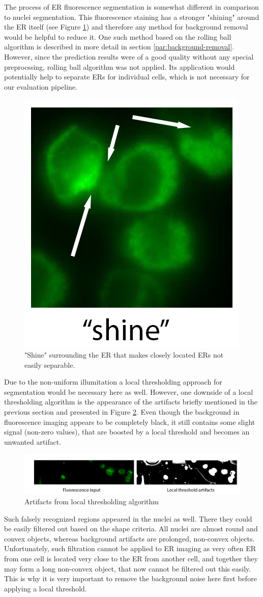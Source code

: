 The process of ER fluorescence segmentation is somewhat different in comparison to nuclei segmentation. This fluorescence staining has a stronger "shining" around the ER itself (see Figure \ref{fig:shine-er}) and therefore any method for background removal would be helpful to reduce it. One such method based on the rolling ball algorithm is described in more detail in section \ref{par:background-removal}. However, since the prediction results were of a good quality without any special preprocssing, rolling ball algorithm was not applied. Its application would potentially help to separate ERs for individual cells, which is not necessary for our evaluation pipeline.

\begin{figure}[htb]
	\begin{center}
		\includegraphics[width=0.2\linewidth]{bilder/ER/shine.png}
		\caption{"Shine" surrounding the ER that makes closely located ERs not easily separable.}\label{fig:shine-er}
	\end{center}
\end{figure}

Due to the non-uniform illumitation a local thresholding approach for segmentation would be necessary here as well. However, one downside of a local thresholding algorithm is the appearance of the artifacts briefly mentioned in the previous section and presented in Figure \ref{fig:artifacts-er}. Even though the background in fluorescence imaging appears to be completely black, it still contains some slight signal (non-zero values), that are boosted by a local threshold and becomes an unwanted artifact. 
\begin{figure}[H]
	\begin{center}
		\includegraphics[width=\linewidth]{bilder/ER/artifacts.png}
		\caption{Artifacts from local thresholding algorithm}\label{fig:artifacts-er}
	\end{center}
\end{figure}
Such falsely recognized regions appeared in the nuclei as well. There they could be easily filtered out based on the shape criteria. All nuclei are almost round and convex objects, whereas background artifacts are prolonged, non-convex objects. Unfortunately, such filtration cannot be applied to ER imaging as very often ER from one cell is located very close to the ER from another cell, and together they may form a long non-convex object, that now cannot be filtered out this easily. This is why it is very important to remove the background noise here first before applying a local threshold.

